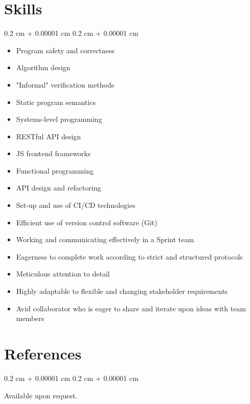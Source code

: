 \documentclass[10pt, a4paper]{article}
\newenvironment{highlightsforbulletentries}{
    \begin{itemize}[
        topsep=0.10 cm,
        parsep=0.10 cm,
        partopsep=0pt,
        itemsep=0pt,
        leftmargin=10pt
    ]
}{
    \end{itemize}
} %
\newenvironment{onecolentry}{
    \begin{adjustwidth}{
        0.2 cm + 0.00001 cm
    }{
        0.2 cm + 0.00001 cm
    }
}{
    \end{adjustwidth}
} %
\begin{document}
    
    \section{Skills}

    \begin{onecolentry}
        \begin{highlightsforbulletentries}


        \item Program safety and correctness

        \item Algorithm design

        \item "Informal" verification methods

        \item Static program semantics

        \item Systems-level programming

        \item RESTful API design

        \item JS frontend frameworks

        \item Functional programming

        \item API design and refactoring

        \item Set-up and use of CI/CD technologies

        \item Efficient use of version control software (Git)

        \item Working and communicating effectively in a Sprint team

        \item Eagerness to complete work according to strict and structured protocols

        \item Meticulous attention to detail

        \item Highly adaptable to flexible and changing stakeholder requirements

        \item Avid collaborator who is eager to share and iterate upon ideas with team members


        \end{highlightsforbulletentries}
    \end{onecolentry}

    \section{References}



        
        \begin{onecolentry}
            Available upon request.
        \end{onecolentry}


    
\end{document}
